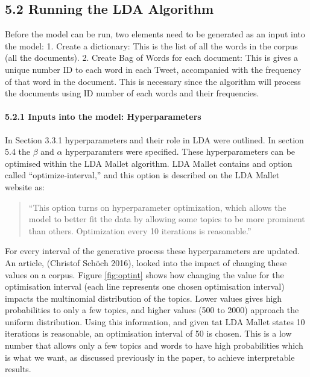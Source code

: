 \documentclass[
]{article}
\begin{document}
\hypertarget{running-the-lda-algorithm}{%
\subsection{5.2 Running the LDA
Algorithm}\label{running-the-lda-algorithm}}

Before the model can be run, two elements need to be generated as an
input into the model: 1. Create a dictionary: This is the list of all
the words in the corpus (all the documents). 2. Create Bag of Words for
each document: This is gives a unique number ID to each word in each
Tweet, accompanied with the frequency of that word in the document. This
is necessary since the algorithm will process the documents using ID
number of each words and their frequencies.

\hypertarget{inputs-into-the-model-hyperparameters}{%
\paragraph{5.2.1 Inputs into the model:
Hyperparameters}\label{inputs-into-the-model-hyperparameters}}

In Section 3.3.1 hyperparameters and their role in LDA were outlined. In
section 5.4 the \(\beta\) and \(\alpha\) hyperparamters were specified.
These hyperparameters can be optimised within the LDA Mallet algorithm.
LDA Mallet contains and option called ``optimize-interval,'' and this
option is described on the LDA Mallet website as:

\begin{quote}
``This option turns on hyperparameter optimization, which allows the
model to better fit the data by allowing some topics to be more
prominent than others. Optimization every 10 iterations is reasonable.''
\end{quote}

For every interval of the generative process these hyperparameters are
updated. An article, (Christof Schöch 2016), looked into the impact of
changing these values on a corpus. Figure \ref{fig:optint} shows how
changing the value for the optimisation interval (each line represents
one chosen optimisation interval) impacts the multinomial distribution
of the topics. Lower values gives high probabilities to only a few
topics, and higher values (500 to 2000) approach the uniform
distribution. Using this information, and given tat LDA Mallet states 10
iterations is reasonable, an optimisation interval of 50 is chosen. This
is a low number that allows only a few topics and words to have high
probabilities which is what we want, as discussed previously in the
paper, to achieve interpretable results.
\end{document}
